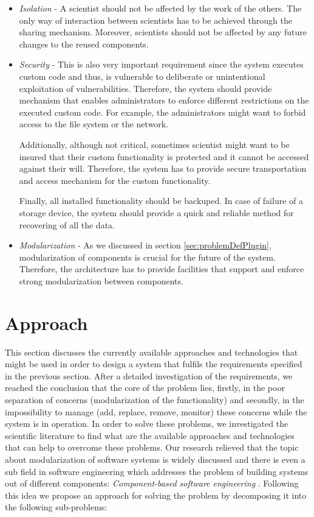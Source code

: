 \begin{itemize}
	
	\item \textit{Isolation} - A scientist should not be affected by the work of the others. The only way of interaction between scientists has to be achieved through the sharing mechanism. Moreover, scientists should not be affected by any future changes to the reused components.
		
	\item \textit{Security} - This is also very important requirement since the system executes custom code and thus, is vulnerable to deliberate or unintentional exploitation of vulnerabilities. Therefore, the system should provide mechanism that enables administrators to enforce different restrictions on the executed custom code. For example, the administrators might want to forbid access to the file system or the network.
	
	Additionally, although not critical, sometimes scientist might want to be insured that their custom functionality is protected and it cannot be accessed against their will. Therefore, the system has to provide secure transportation and access mechanism for the custom functionality.
	
	Finally, all installed functionality should be backuped. In case of failure of a storage device, the system should provide a quick and reliable method for recovering of all the data.
	
	\item \textit{Modularization} - As we discussed in section \ref{sec:problemDefPlugin}, modularization of components is crucial for the future of the system. Therefore, the architecture has to provide facilities that support and enforce strong modularization between components.
	
\end{itemize}

\section{Approach}
\label{sec:approachPlugin}

This section discusses the currently available approaches and technologies that might be used in order to design a system that fulfils the requirements specified in the previous section. After a detailed investigation of the requirements, we reached the conclusion that the core of the problem lies, firstly, in the poor separation of concerns (modularization of the functionality) and secondly, in the impossibility to manage (add, replace, remove, monitor) these concerns while the system is in operation. In order to solve these problems, we investigated the scientific literature to find what are the available approaches and technologies that can help to overcome these problems. Our research relieved that the topic about modularization of software systems is widely discussed and there is even a sub field in software engineering which addresses the problem of building systems out of different components: \textit{Component-based software engineering}  \cite{jifeng2005component}. Following this idea we propose an approach for solving the problem by decomposing it into the following sub-problems:

